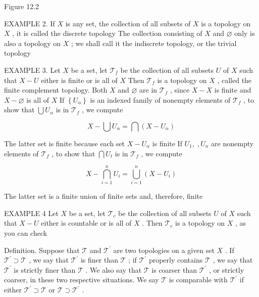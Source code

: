 \documentclass[10pt]{article}
\begin{document}
Figure 12.2

EXAMPLE 2. If \(X\) is any set, the collection of all subsets of \(X\) is a topology on \(X\) , it is called the discrete topology The collection consisting of \(X\) and \(\varnothing\) only is also a topology on \(X\) ; we shall call it the indiscrete topology, or the trivial topology

EXAMPLE 3. Let \(X\) be a set, let \({\mathcal{T}}_{f}\) be the collection of all subsets \(U\) of \(X\) such that \(X - U\) either is finite or is all of \(X\) Then \({\mathcal{T}}_{f}\) is a topology on \(X\) , called the finite complement topology. Both \(X\) and \(\varnothing\) are in \({\mathcal{T}}_{f}\) , since \(X - X\) is finite and \(X - \varnothing\) is all of \(X\) If \(\left\{  {U}_{\alpha }\right\}\) is an indexed family of nonempty elements of \({\mathcal{T}}_{f}\) , to show that \(\bigcup {U}_{\alpha }\) is in \({\mathcal{T}}_{f}\) , we compute

\[
X - \bigcup {U}_{\alpha } = \bigcap \left( {X - {U}_{\alpha }}\right)
\]

The latter set is finite because each set \(X - {U}_{\alpha }\) is finite If \({U}_{1},\;,{U}_{n}\) are nonempty elements of \({\mathcal{T}}_{f}\) , to show that \(\bigcap {U}_{t}\) is in \({\mathcal{T}}_{f}\) , we compute

\[
X - \mathop{\bigcap }\limits_{{i = 1}}^{n}{U}_{i} = \mathop{\bigcup }\limits_{{i = 1}}^{n}\left( {X - {U}_{i}}\right)
\]

The latter set is a finite union of finite sets and, therefore, finite

EXAMPLE 4 Let \(X\) be a set, let \({\mathcal{T}}_{c}\) be the collection of all subsets \(U\) of \(X\) such that \(X - U\) either is countable or is all of \(X\) . Then \({\mathcal{T}}_{c}\) is a topology on \(X\) , as you can check

Definition. Suppose that \(\mathcal{T}\) and \({\mathcal{T}}^{\prime }\) are two topologies on a given set \(X\) . If \({\mathcal{T}}^{\prime } \supset  \mathcal{T}\) , we say that \({\mathcal{T}}^{\prime }\) is finer than \(\mathcal{T}\) ; if \({\mathcal{T}}^{\prime }\) properly contains \(\mathcal{T}\) , we say that \({\mathcal{T}}^{\prime }\) is strictly finer than \(\mathcal{T}\) . We also say that \(\mathcal{T}\) is coarser than \({\mathcal{T}}^{\prime }\) , or strictly coarser, in these two respective situations. We say \(\mathcal{T}\) is comparable with \({\mathcal{T}}^{\prime }\) if either \({\mathcal{T}}^{\prime } \supset  \mathcal{T}\) or \(\mathcal{T} \supset  {\mathcal{T}}^{\prime }\) .
\end{document}
